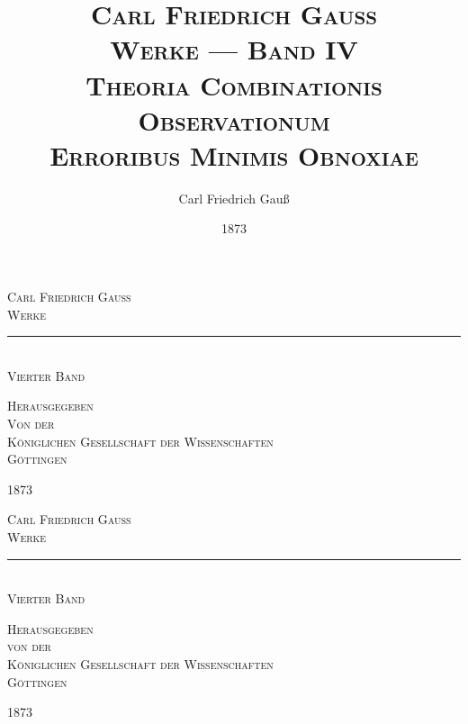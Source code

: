 \documentclass[12pt,a4paper]{book}
\title{\Huge\textsc{Carl Friedrich Gauß}\\[1em]
\LARGE\textsc{Werke --- Band IV}\\[0.5em]
\large\textsc{Theoria Combinationis Observationum\\
Erroribus Minimis Obnoxiae}}
\author{Carl Friedrich Gauß}
\date{1873}
\begin{document}
\frontmatter
\thispagestyle{empty}

\begin{titlepage}
\begin{center}
\vspace*{3cm}

{\Huge\textsc{Carl Friedrich Gauß}}\\[2em]
{\LARGE\textsc{Werke}}\\[1em]
\rule{0.8\textwidth}{0.4pt}\\[1em]
{\Large\textsc{Vierter Band}}\\[2em]

\vfill

{\large\textsc{Herausgegeben\\[0.3em]
Von der\\[0.3em]
Königlichen Gesellschaft der Wissenschaften\\[0.3em]
Göttingen}}\\[2em]

\vfill

{\large 1873}

\end{center}
\end{titlepage}

\newpage
\thispagestyle{empty}
\null
\newpage

\thispagestyle{empty}
\begin{center}
\vspace*{3cm}

{\Large\textsc{Carl Friedrich Gauß}}\\[2em]
{\LARGE\textsc{Werke}}\\[1em]
\rule{0.6\textwidth}{0.4pt}\\[1em]
{\Large\textsc{Vierter Band}}\\[2em]

\vspace{2cm}

{\large\textsc{Herausgegeben\\[0.3em]
von der\\[0.3em]
Königlichen Gesellschaft der Wissenschaften\\[0.3em]
Göttingen}}\\[2em]

\vfill

{\large 1873}

\end{center}
\end{document}
